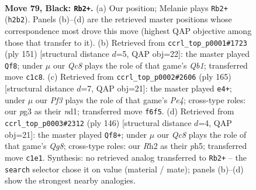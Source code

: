 \documentclass[11pt]{article}
\begin{document}
\clearpage

\begin{figure}[p]\centering
\begin{subfigure}{0.46\textwidth}\centering
\resizebox{\linewidth}{!}{%
\newchessgame
\chessboard[
  setfen={3Q4/8/5pk1/1K6/8/6P1/7r/2q5 b - - 9 79},
  showmover=false,
  pgfstyle=straightmove, color=movearrow, markmove={h2-b2}
]}
\caption{}
\end{subfigure}\hfill
\begin{subfigure}{0.46\textwidth}\centering
\resizebox{\linewidth}{!}{%
\newchessgame
\chessboard[
  setfen={1q6/3Q4/8/5pk1/8/1P6/6K1/8 b - - 11 76},
  showmover=false,
  pgfstyle=straightmove, color=movearrow, markmove={b8-f8}
]}
\caption{}
\end{subfigure}
\\[4pt]
\begin{subfigure}{0.46\textwidth}\centering
\resizebox{\linewidth}{!}{%
\newchessgame
\chessboard[
  setfen={8/8/4k3/2Q1p3/7q/5K2/8/3N4 b - - 5 83},
  showmover=false,
  pgfstyle=straightmove, color=movearrow, markmove={e5-e4}
]}
\caption{}
\end{subfigure}\hfill
\begin{subfigure}{0.46\textwidth}\centering
\resizebox{\linewidth}{!}{%
\newchessgame
\chessboard[
  setfen={6Q1/8/3p1k2/7p/q7/8/1KP5/8 w - - 2 74},
  showmover=false,
  pgfstyle=straightmove, color=movearrow, markmove={g8-f8}
]}
\caption{}
\end{subfigure}
\caption{\textbf{Move 79, Black: \texttt{Rb2+}.} (a) Our position; Melanie plays \texttt{Rb2+} (\texttt{h2b2}). Panels (b)--(d) are the retrieved master positions whose correspondence most drove this move (highest QAP objective among those that transfer to it). (b) Retrieved from \texttt{ccrl\_top\_p0001\#1723} (ply 151) [structural distance $d$=5, QAP obj=22]: the master played \texttt{Qf8}; under $\mu$ our \emph{Qc8} plays the role of that game's \emph{Qb1}; transferred move \texttt{c1c8}. (c) Retrieved from \texttt{ccrl\_top\_p0002\#2606} (ply 165) [structural distance $d$=7, QAP obj=21]: the master played \texttt{e4+}; under $\mu$ our \emph{Pf3} plays the role of that game's \emph{Pe4}; cross-type roles: our \emph{p}g3 as their \emph{n}d1; transferred move \texttt{f6f5}. (d) Retrieved from \texttt{ccrl\_top\_p0003\#2312} (ply 146) [structural distance $d$=4, QAP obj=21]: the master played \texttt{Qf8+}; under $\mu$ our \emph{Qc8} plays the role of that game's \emph{Qg8}; cross-type roles: our \emph{R}h2 as their \emph{p}h5; transferred move \texttt{c1e1}. Synthesis: no retrieved analog transferred to \texttt{Rb2+} -- the \texttt{search} selector chose it on value (material / mate); panels (b)--(d) show the strongest nearby analogies.}
\label{fig:thought-m157}
\end{figure}
\end{document}
